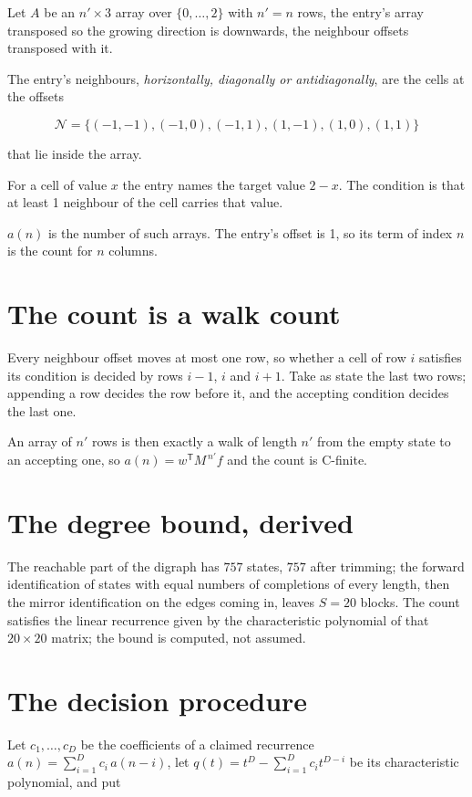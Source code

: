 \documentclass[11pt]{article}
\theoremstyle{definition}
\begin{document}
Let $A$ be an $n' \times 3$ array over $\{0,\dots,2\}$ with $n' = n$ rows, the entry's array transposed so the growing direction is downwards, the neighbour offsets transposed with it.

The entry's neighbours, {\itshape horizontally, diagonally or antidiagonally}, are the cells at the offsets

\[\mathcal{N} = \{(-1,-1), (-1,0), (-1,1), (1,-1), (1,0), (1,1)\}\]

that lie inside the array.

For a cell of value $x$ the entry names the target value $2 - x$. The condition is that at least 1 neighbour of the cell carries that value.

$a(n)$ is the number of such arrays. The entry's offset is 1, so its term of index $n$ is the count for $n$ columns.

\section{The count is a walk count}

Every neighbour offset moves at most one row, so whether a cell of row $i$ satisfies its condition is decided by rows $i-1$, $i$ and $i+1$. Take as state the last two rows; appending a row decides the row before it, and the accepting condition decides the last one.

An array of $n'$ rows is then exactly a walk of length $n'$ from the empty state to an accepting one, so $a(n) = w^{\mathsf T}M^{\,n'}f$ and the count is C-finite.

\section{The degree bound, derived}

The reachable part of the digraph has $757$ states, $757$ after trimming; the forward identification of states with equal numbers of completions of every length, then the mirror identification on the edges coming in, leaves $S = 20$ blocks. The count satisfies the linear recurrence given by the characteristic polynomial of that $20\times20$ matrix; the bound is computed, not assumed.

\section{The decision procedure}

Let $c_1,\dots,c_D$ be the coefficients of a claimed recurrence $a(n) = \sum_{i=1}^{D} c_i\,a(n-i)$, let $q(t) = t^{D} - \sum_{i=1}^{D} c_i t^{D-i}$ be its characteristic polynomial, and put
\end{document}
